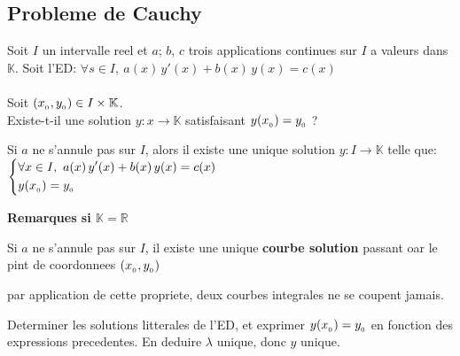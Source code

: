 \documentclass[12pt,twoside,a4paper]{article}
\begin{document}
		\subsection{Probleme de Cauchy}
			Soit $I$ un intervalle reel et $a$; $b$, $c$ trois applications continues sur $I$ a valeurs dans $\mathbb{K}$.
			Soit l'ED: $\forall s\in I,\ a(x)\,y'(x)+b(x)\,y(x)=c(x)$\\
			\\
			Soit $(x_{_{0}},y_{_{0}})\in I\times\mathbb{K}$. \\
			Existe-t-il une solution $y:x\rightarrow\mathbb{K}$ satisfaisant $y(x_{_{0}})=y_{_{0}}$ ?
			\begin{prop}
				Si $a$ ne s'annule pas sur $I$, alors il existe une unique solution $y:I\rightarrow\mathbb{K}$ telle que:\\
				$\left\{\begin{aligned}&\forall x\in I,\ a(x)\,y'(x)+b(x)\,y(x)=c(x)\\&y(x\uu0)=y\uu0\end{aligned}\right.$
			\end{prop}
			\textbf{Remarques si $\mathbb{K=R}$}
			\begin{liste}
				\item Si $a$ ne s'annule pas sur $I$, il existe une unique \textbf{courbe solution} passant oar le pint de coordonnees $(x_{_{0}},y_{_{0}})$
				\item par application de cette propriete, deux courbes integrales ne se coupent jamais.
			\end{liste}
			\begin{preuve}
				Determiner les solutions litterales de l'ED, et exprimer $y(x_{_{0}})=y_{_{0}}$ en fonction des expressions precedentes. En deduire $\lambda$ unique, donc $y$ unique.
			\end{preuve}
\end{document}
